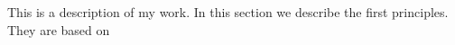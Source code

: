 This is a description of my work. In this section we describe the first principles. They are based on \cite{Aggarwal2013a}
